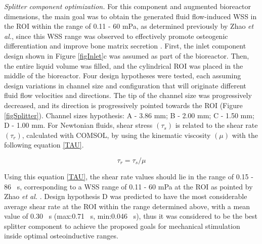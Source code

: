 \textit{Splitter component optimization.} For this component and augmented bioreactor dimensions, the main goal was to obtain the generated fluid flow-induced \ac{WSS} in the \ac{ROI} within the range of 0.11 - 60 \si{\milli\pascal}, as determined previously by Zhao \textit{et al.}, since this \ac{WSS} range was observed to effectively promote osteogenic differentiation and improve bone matrix secretion \cite{Zhao2018-ci}. First, the inlet component design shown in Figure \ref{figInlet}c was assumed as part of the bioreactor. Then, the entire liquid volume was filled, and the cylindrical \ac{ROI} was placed in the middle of the bioreactor. Four design hypotheses were tested, each assuming design variations in channel size and configuration that will originate different fluid flow velocities and directions. The tip of the channel size was progressively decreased, and its direction is progressively pointed towards the \ac{ROI} (Figure \ref{figSplitter}). Channel sizes hypothesis: A - 3.86 \si{\milli\meter}; B - 2.00 \si{\milli\meter}; C - 1.50 \si{\milli\meter}; D - 1.00 \si{\milli\meter}. For Newtonian fluids, shear stress $(\tau_s)$ is related to the shear rate $(\tau_r)$, calculated with COMSOL, by using the kinematic viscosity $(\mu)$ with the following equation \ref{TAU}.

\begin{equation}
\label{TAU}
\tau_r = \tau_s/\mu
\end{equation}

Using this equation \ref{TAU}, the shear rate values should lie in the range of 0.15 - 86 \si{\per\second}, corresponding to a \ac{WSS} range of 0.11 - 60 \si{\milli\pascal} at the \ac{ROI} as pointed by Zhao \textit{et al.} \cite{Zhao2018-ci}. Design hypothesis D was predicted to have the most considerable average shear rate at the \ac{ROI} within the range determined above, with a mean value of 0.30 \si{\per\second} (max:0.71 \si{\per\second}, min:0.046 \si{\per\second}), thus it was considered to be the best splitter component to achieve the proposed goals for mechanical stimulation inside optimal osteoinductive ranges.


